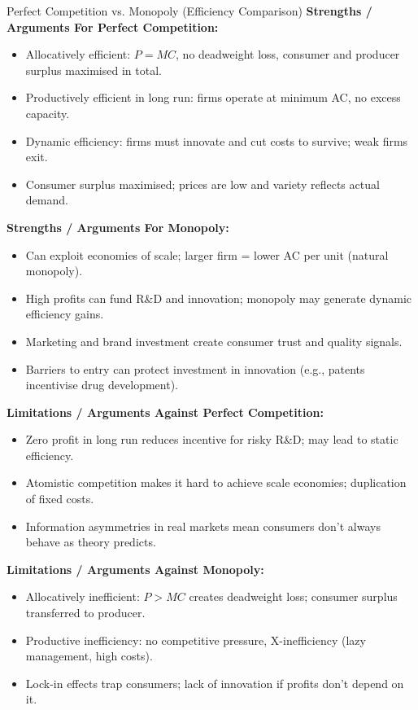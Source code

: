 \documentclass[11pt, a4paper, twoside]{book}
\begin{document}
\begin{evaluation}{Perfect Competition vs. Monopoly (Efficiency Comparison)}
\textbf{Strengths / Arguments For Perfect Competition:}
\begin{itemize}[leftmargin=*, nosep]
\item Allocatively efficient: $P = MC$, no deadweight loss, consumer and producer surplus maximised in total.
\item Productively efficient in long run: firms operate at minimum AC, no excess capacity.
\item Dynamic efficiency: firms must innovate and cut costs to survive; weak firms exit.
\item Consumer surplus maximised; prices are low and variety reflects actual demand.
\end{itemize}
\textbf{Strengths / Arguments For Monopoly:}
\begin{itemize}[leftmargin=*, nosep]
\item Can exploit economies of scale; larger firm = lower AC per unit (natural monopoly).
\item High profits can fund R\&D and innovation; monopoly may generate dynamic efficiency gains.
\item Marketing and brand investment create consumer trust and quality signals.
\item Barriers to entry can protect investment in innovation (e.g., patents incentivise drug development).
\end{itemize}
\textbf{Limitations / Arguments Against Perfect Competition:}
\begin{itemize}[leftmargin=*, nosep]
\item Zero profit in long run reduces incentive for risky R\&D; may lead to static efficiency.
\item Atomistic competition makes it hard to achieve scale economies; duplication of fixed costs.
\item Information asymmetries in real markets mean consumers don't always behave as theory predicts.
\end{itemize}
\textbf{Limitations / Arguments Against Monopoly:}
\begin{itemize}[leftmargin=*, nosep]
\item Allocatively inefficient: $P > MC$ creates deadweight loss; consumer surplus transferred to producer.
\item Productive inefficiency: no competitive pressure, X-inefficiency (lazy management, high costs).
\item Lock-in effects trap consumers; lack of innovation if profits don't depend on it.

\end{itemize}
\end{evaluation}
\end{document}
